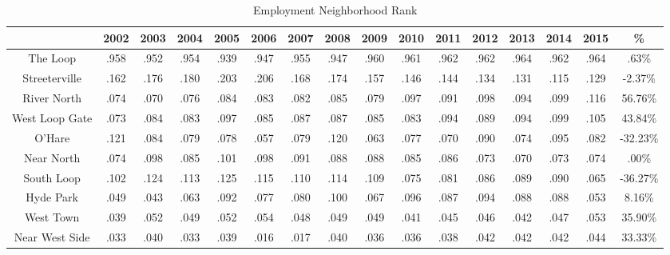 \documentclass{article}
\theoremstyle{definition}
\theoremstyle{remark}
\begin{document}
\begin{table}[h]\centering
\caption{Employment Neighborhood Rank}\label{thelabel}
\begin{adjustbox}{center}
\begin{tabular}{||c | c c c c c c c c c c c c c c | c ||} 
 \hline
 & 2002 & 2003 & 2004 & 2005 & 2006 & 2007 & 2008 & 2009 & 2010 & 2011 & 2012 & 2013 & 2014 & 2015 & \%\\[0.5ex] 
 \hline\hline
The Loop & .958 & .952 & .954 & .939 & .947 & .955 & .947 & .960 & .961 & .962 & .962 & .964 & .962 & .964 & .63\% \\
Streeterville & .162 & .176 & .180 & .203 & .206 & .168 & .174 & .157 & .146 & .144 & .134 & .131 & .115 & .129 & -2.37\% \\
River North & .074 & .070 & .076 & .084 & .083 & .082 & .085 & .079 & .097 & .091 & .098 & .094 & .099 & .116 & 56.76\% \\
West Loop Gate & .073 & .084 & .083 & .097 & .085 & .087 & .087 & .085 & .083 & .094 & .089 & .094 & .099 & .105 & 43.84\% \\
O'Hare & .121 & .084 & .079 & .078 & .057 & .079 & .120 & .063 & .077 & .070 & .090 & .074 & .095 & .082 & -32.23\% \\
Near North & .074 & .098 & .085 & .101 & .098 & .091 & .088 & .088 & .085 & .086 & .073 & .070 & .073 & .074 & .00\% \\
South Loop & .102 & .124 & .113 & .125 & .115 & .110 & .114 & .109 & .075 & .081 & .086 & .089 & .090 & .065 & -36.27\% \\
Hyde Park & .049 & .043 & .063 & .092 & .077 & .080 & .100 & .067 & .096 & .087 & .094 & .088 & .088 & .053 & 8.16\% \\
West Town & .039 & .052 & .049 & .052 & .054 & .048 & .049 & .049 & .041 & .045 & .046 & .042 & .047 & .053 & 35.90\% \\
Near West Side & .033 & .040 & .033 & .039 & .016 & .017 & .040 & .036 & .036 & .038 & .042 & .042 & .042 & .044 & 33.33\% \\ \hline
 \end{tabular}
\end{adjustbox}
\end{table}
\\
\end{document}
